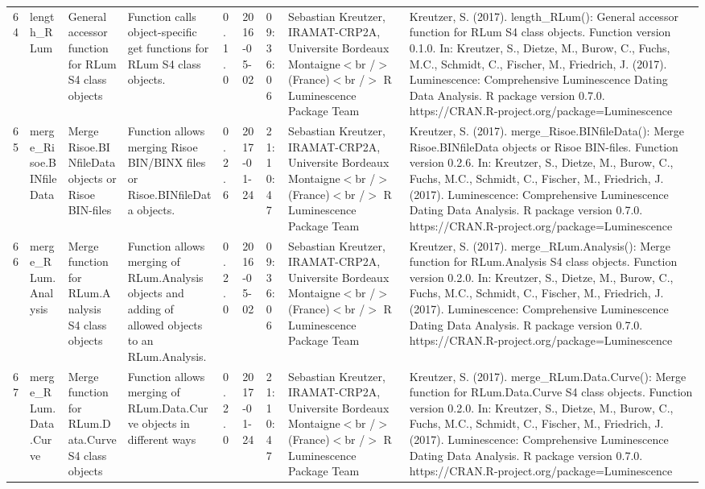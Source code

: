 \begin{table}[ht]
\begin{tabular}{rllllllll}
  64 & length\_RLum & General accessor function for RLum S4 class objects & Function calls object-specific get functions for RLum S4 class objects. & 0.1.0 & 2016-05-02 & 09:36:06
 & Sebastian Kreutzer, IRAMAT-CRP2A, Universite Bordeaux Montaigne$<$br /$>$ (France)$<$br /$>$  R Luminescence Package Team & Kreutzer, S. (2017). length\_RLum(): General accessor function for RLum S4 class objects. Function version 0.1.0. In: Kreutzer, S., Dietze, M., Burow, C., Fuchs, M.C., Schmidt, C., Fischer, M., Friedrich, J. (2017). Luminescence: Comprehensive Luminescence Dating Data Analysis. R package version 0.7.0. https://CRAN.R-project.org/package=Luminescence
 \\ 
  65 & merge\_Risoe.BINfileData & Merge Risoe.BINfileData objects or Risoe BIN-files & Function allows merging Risoe BIN/BINX files or Risoe.BINfileData objects. & 0.2.6 & 2017-01-24 & 21:10:47
 & Sebastian Kreutzer, IRAMAT-CRP2A, Universite Bordeaux Montaigne$<$br /$>$ (France)$<$br /$>$  R Luminescence Package Team & Kreutzer, S. (2017). merge\_Risoe.BINfileData(): Merge Risoe.BINfileData objects or Risoe BIN-files. Function version 0.2.6. In: Kreutzer, S., Dietze, M., Burow, C., Fuchs, M.C., Schmidt, C., Fischer, M., Friedrich, J. (2017). Luminescence: Comprehensive Luminescence Dating Data Analysis. R package version 0.7.0. https://CRAN.R-project.org/package=Luminescence
 \\ 
  66 & merge\_RLum.Analysis & Merge function for RLum.Analysis S4 class objects & Function allows merging of RLum.Analysis objects and adding of allowed objects to an RLum.Analysis. & 0.2.0 & 2016-05-02 & 09:36:06
 & Sebastian Kreutzer, IRAMAT-CRP2A, Universite Bordeaux Montaigne$<$br /$>$ (France)$<$br /$>$  R Luminescence Package Team & Kreutzer, S. (2017). merge\_RLum.Analysis(): Merge function for RLum.Analysis S4 class objects. Function version 0.2.0. In: Kreutzer, S., Dietze, M., Burow, C., Fuchs, M.C., Schmidt, C., Fischer, M., Friedrich, J. (2017). Luminescence: Comprehensive Luminescence Dating Data Analysis. R package version 0.7.0. https://CRAN.R-project.org/package=Luminescence
 \\ 
  67 & merge\_RLum.Data.Curve & Merge function for RLum.Data.Curve S4 class objects & Function allows merging of RLum.Data.Curve objects in different ways & 0.2.0 & 2017-01-24 & 21:10:47
 & Sebastian Kreutzer, IRAMAT-CRP2A, Universite Bordeaux Montaigne$<$br /$>$ (France)$<$br /$>$  R Luminescence Package Team & Kreutzer, S. (2017). merge\_RLum.Data.Curve(): Merge function for RLum.Data.Curve S4 class objects. Function version 0.2.0. In: Kreutzer, S., Dietze, M., Burow, C., Fuchs, M.C., Schmidt, C., Fischer, M., Friedrich, J. (2017). Luminescence: Comprehensive Luminescence Dating Data Analysis. R package version 0.7.0. https://CRAN.R-project.org/package=Luminescence

\end{tabular}
\end{table}
